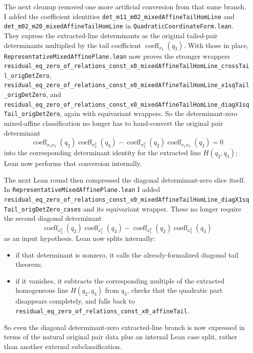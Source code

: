 \documentclass[11pt]{article}
\begin{document}
The next cleanup removed one more artificial conversion from that same branch.
I added the coefficient identities
\texttt{det\_m11\_m02\_mixedAffineTailHomLine} and
\texttt{det\_m02\_m20\_mixedAffineTailHomLine} in
\texttt{QuadraticCoordinateForm.lean}. They express the extracted-line
determinants as the original tailed-pair determinants multiplied by the tail
coefficient \(\operatorname{coeff}_{x_2}(q_3)\). With those in place,
\texttt{RepresentativeMixedAffinePlane.lean} now proves the stronger wrappers
\texttt{residual\_eq\_zero\_of\_relations\_const\_x0\_mixedAffineTailHomLine\_crossTail\_origDetZero},
\texttt{residual\_eq\_zero\_of\_relations\_const\_x0\_mixedAffineTailHomLine\_x1sqTail\_origDetZero},
and
\texttt{residual\_eq\_zero\_of\_relations\_const\_x0\_mixedAffineTailHomLine\_diagX1sqTail\_origDetZero},
again with equivariant wrappers. So the determinant-zero mixed-affine
classification no longer has to hand-convert the original pair determinant
\[
  \operatorname{coeff}_{x_1x_2}(q_2)\operatorname{coeff}_{x_2^2}(q_3)
  -
  \operatorname{coeff}_{x_2^2}(q_2)\operatorname{coeff}_{x_1x_2}(q_3)=0
\]
into the corresponding determinant identity for the extracted line
\(H(q_2,q_3)\); Lean now performs that conversion internally.

The next Lean round then compressed the diagonal determinant-zero slice itself.
In \texttt{RepresentativeMixedAffinePlane.lean} I added
\texttt{residual\_eq\_zero\_of\_relations\_const\_x0\_mixedAffineTailHomLine\_diagX1sqTail\_origDetZero\_cases}
and its equivariant wrapper. These no longer require the second diagonal
determinant
\[
  \operatorname{coeff}_{x_2^2}(q_2)\operatorname{coeff}_{x_1^2}(q_3)
  -
  \operatorname{coeff}_{x_1^2}(q_2)\operatorname{coeff}_{x_2^2}(q_3)
\]
as an input hypothesis. Lean now splits internally:
\begin{itemize}
\item if that determinant is nonzero, it calls the already-formalized diagonal
tail theorem;
\item if it vanishes, it subtracts the corresponding multiple of the extracted
homogeneous line \(H(q_2,q_3)\) from \(q_3\), checks that the quadratic part
disappears completely, and falls back to
\texttt{residual\_eq\_zero\_of\_relations\_const\_x0\_affineTail}.
\end{itemize}
So even the diagonal determinant-zero extracted-line branch is now expressed in
terms of the natural original pair data plus an internal Lean case split,
rather than another external subclassification.
\end{document}
